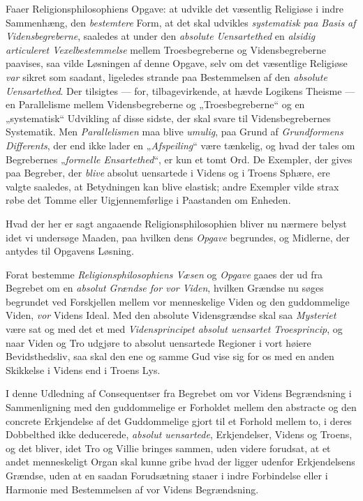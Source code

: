 \documentclass[12pt,a4paper]{book}
\newcommand{\opage}[1]{\marginnote{\footnotesize\textit{[#1]}}}
\begin{document}
Faaer Religionsphilosophiens Opgave: at udvikle det væsentlig Religiøse i indre Sammenhæng, den \emph{bestemtere} Form, at det skal udvikles \emph{systematisk paa Basis af Vidensbegreberne}, saaledes at under den \emph{absolute Uensartethed} en \emph{alsidig articuleret Vexelbestemmelse} mellem Troesbegreberne og Vidensbegreberne paavises, saa vilde Løsningen af denne Opgave, selv om det væsentlige
Religiøse \emph{var} sikret som saadant, ligeledes strande paa Bestemmelsen af den \emph{absolute
Uensartethed}. Der tilsigtes --- for, tilbagevirkende, at hævde Logikens Theisme --- en
Parallelisme mellem Vidensbegreberne og „Troesbegreberne“ og en „systematisk“ Udvikling af disse
sidste, der \opage{204}skal svare til Vidensbegrebernes Systematik. Men \emph{Parallelismen} maa blive \emph{umulig}, paa Grund af \emph{Grundformens Differents}, der end ikke lader en „\emph{Afspeiling}“ være tænkelig,
og hvad der tales om Begrebernes „\emph{formelle Ensartethed}“, er kun et tomt Ord. De Exempler, der
gives paa Begreber, der \emph{blive} absolut uensartede i Videns og i Troens Sphære, ere valgte
saaledes, at Betydningen kan blive elastisk; andre Exempler vilde strax røbe det Tomme eller
Uigjennemførlige i Paastanden om Enheden.

Hvad der her er sagt angaaende Religionsphilosophien bliver nu nærmere belyst idet vi undersøge
Maaden, paa hvilken dens \emph{Opgave} begrundes, og Midlerne, der antydes til Opgavens Løsning.

Forat bestemme \emph{Religionsphilosophiens Væsen} og \emph{Opgave} gaaes der ud fra Begrebet om en
\emph{absolut Grændse for vor Viden}, hvilken Grændse nu søges begrundet ved Forskjellen mellem
vor menneskelige Viden og den guddommelige Viden, \emph{vor} Videns Ideal. Med den absolute
Vidensgrændse skal saa \emph{Mysteriet} være sat og med det et med \emph{Vidensprincipet absolut uensartet Troesprincip}, og naar Viden og Tro udgjøre to absolut uensartede Regioner i vort høiere
Bevidsthedsliv, saa skal den ene og samme Gud vise sig for os med en anden Skikkelse i Videns end
i Troens Lys.

I denne Udledning af Consequentser fra Begrebet om vor Videns Begrændsning i Sammenligning med
den guddommelige er Forholdet mellem den abstracte og den concrete Erkjendelse af det
Guddommelige gjort til et Forhold mellem to, i deres Dobbelthed ikke deducerede, \emph{absolut
uensartede}, Erkjendelser, Videns og Troens, og det bliver, idet Tro og Villie bringes sammen,
uden videre forudsat, at et andet menneskeligt Organ skal kunne gribe hvad der ligger udenfor
Erkjendelsens Grændse, uden at en saadan Forudsætning staaer i indre Forbindelse eller i Harmonie
med Bestemmelsen af vor Videns Begrændsning.
\end{document}

